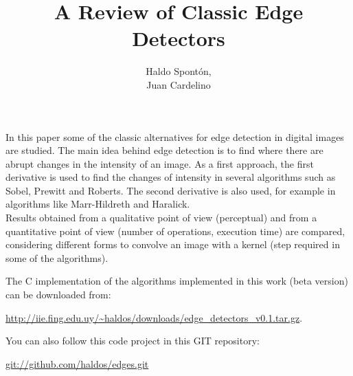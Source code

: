 \documentclass{ipol}
\numberwithin{equation}{section}
\numberwithin{table}{section}
\numberwithin{figure}{section}
\begin{document}



\title{A Review of Classic Edge Detectors}
\author{Haldo Spont\'on,\\
        Juan Cardelino}
\date{}
\ipolMaketitle


\begin{ipolAbstract}
In this paper some of the classic alternatives for edge detection in digital images are studied. The main idea 
behind edge detection is to find where there are abrupt changes in the intensity of an image. 
As a first approach, the first derivative is used to find the changes of intensity in several algorithms 
such as Sobel, Prewitt and Roberts. The second derivative is also used, for example in algorithms 
like Marr-Hildreth and Haralick.\\
Results obtained from a qualitative point of view (perceptual) and from a quantitative 
point of view (number of operations, execution time) are compared, considering different forms to convolve an 
image with a kernel (step required in some of the algorithms).
\end{ipolAbstract}


\begin{ipolCode}
The C implementation of the algorithms implemented in this work (beta version) can be
downloaded from:
\begin{center}
\href{http://iie.fing.edu.uy/~haldos/downloads/edge_detectors_v0.1.tar.gz}{\url{http://iie.fing.edu.uy/~haldos/downloads/edge_detectors_v0.1.tar.gz}}.
\end{center}
You can also follow this code project in this GIT repository: 
\begin{center}
\url{git://github.com/haldos/edges.git}
\end{center}
\end{ipolCode}
\end{document}
